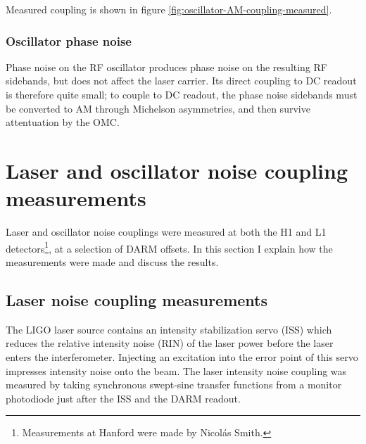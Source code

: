 Measured coupling is shown in figure \ref{fig:oscillator-AM-coupling-measured}.

\subsubsection{Oscillator phase noise}

Phase noise on the RF oscillator produces phase noise on the resulting RF
sidebands, but does not affect the laser carrier.  Its direct coupling to DC
readout is therefore quite small; to couple to DC readout, the phase noise
sidebands must be converted to AM through Michelson asymmetries, and then
survive attentuation by the OMC.

\section{Laser and oscillator noise coupling measurements}

Laser and oscillator noise couplings were measured at both the H1 and
L1 detectors\footnote{Measurements at Hanford were made by Nicol\'as
  Smith.}, at a selection of DARM offsets.  In this section I explain
how the measurements were made and discuss the results.

\subsection{Laser noise coupling measurements}

The LIGO laser source contains an intensity stabilization servo (ISS)
which reduces the relative intensity noise (RIN) of the laser power
before the laser enters the interferometer.  Injecting an excitation
into the error point of this servo impresses intensity noise onto the
beam.  The laser intensity noise coupling was measured by taking
synchronous swept-sine transfer functions from a monitor photodiode
just after the ISS and the DARM readout.

